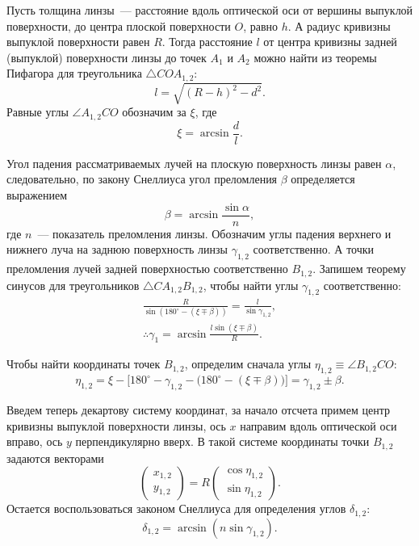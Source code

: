 Пусть толщина линзы~--- расстояние вдоль оптической оси от вершины выпуклой поверхности, до центра плоской поверхности $O$, равно $h$. А радиус кривизны выпуклой поверхности равен $R$. Тогда расстояние $l$ от центра кривизны задней (выпуклой) поверхности линзы до точек $A_1$ и $A_2$ можно найти из теоремы Пифагора для треугольника $\triangle COA_{1,2}$:
\begin{equation*}
	l = \sqrt{(R - h)^2 - d^2}.
\end{equation*}
Равные углы $\angle A_{1,2} C O$ обозначим за $\xi$, где
\begin{equation*}
	\xi = \arcsin \frac{d}{l}.
\end{equation*}

Угол падения рассматриваемых лучей на плоскую поверхность линзы равен $\alpha$, следовательно, по закону Снеллиуса угол преломления $\beta$ определяется выражением
\begin{equation*}
	\beta = \arcsin \frac{\sin \alpha}{n},
\end{equation*}
где $n$~--- показатель преломления линзы. Обозначим углы падения верхнего и нижнего луча на заднюю поверхность линзы $\gamma_{1,2}$ соответственно. А точки преломления лучей задней поверхностью соответственно $B_{1,2}$. Запишем теорему синусов для треугольников $\triangle C A_{1,2} B_{1,2}$, чтобы найти углы $\gamma_{1,2}$ соответственно:
\begin{gather*}
	\frac{R}{\sin (180^\circ - (\xi \mp \beta))} = \frac{l}{\sin \gamma_{1,2}},\\
	\therefore \gamma_1 = \arcsin \frac{l\sin (\xi \mp \beta)}{R}.
\end{gather*}

Чтобы найти координаты точек $B_{1,2}$, определим сначала углы $ \eta_{1,2} \equiv \angle B_{1,2} C O$:
\begin{equation*}
	\eta_{1,2} = \xi - \Big[180^\circ - \gamma_{1,2} - \big(180^\circ - \left(\xi \mp \beta\right)\big)\Big] = \gamma_{1,2} \pm \beta.
\end{equation*}

Введем теперь декартову систему координат, за начало отсчета примем центр кривизны выпуклой поверхности линзы, ось $x$ направим вдоль оптической оси вправо, ось $y$ перпендикулярно вверх. В такой системе координаты точки $B_{1,2}$ задаются векторами
\begin{equation*}
	\begin{pmatrix}
		x_{1,2}\\
		y_{1,2}
	\end{pmatrix}
	= R
	\begin{pmatrix}
		\cos \eta_{1,2}\\
		\sin \eta_{1,2}
	\end{pmatrix}.
\end{equation*}
Остается воспользоваться законом Снеллиуса для определения углов $\delta_{1,2}$:
\begin{equation*}
	\delta_{1,2} = \arcsin \left( n \sin \gamma_{1,2} \right).
\end{equation*}

